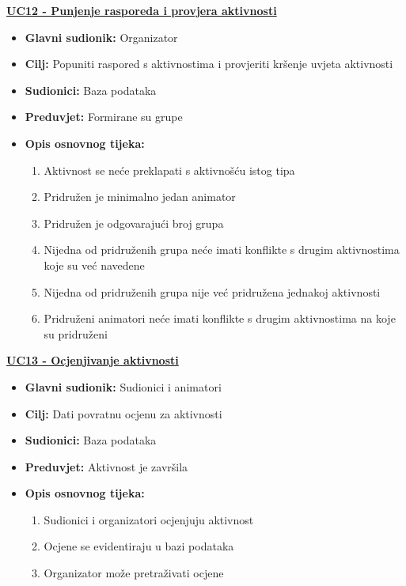 \noindent \underline{\textbf{UC12 - Punjenje rasporeda i provjera aktivnosti}}
\begin{itemize}
	\item \textbf{Glavni sudionik:} Organizator
	\item \textbf{Cilj:} Popuniti raspored s aktivnostima i provjeriti kršenje uvjeta aktivnosti
	\item \textbf{Sudionici:} Baza podataka
	\item \textbf{Preduvjet:} Formirane su grupe
	\item \textbf{Opis osnovnog tijeka:} 
	\begin{enumerate}	
		\item Aktivnost se neće preklapati s aktivnošću istog tipa
		\item Pridružen je minimalno jedan animator
		\item Pridružen je odgovarajući broj grupa
		\item Nijedna od pridruženih grupa neće imati konflikte s drugim aktivnostima koje su već
		navedene
		\item  Nijedna od pridruženih grupa nije već pridružena jednakoj aktivnosti
		\item Pridruženi animatori neće imati konflikte s drugim aktivnostima na koje su pridruženi\\
	\end{enumerate}
	
\end{itemize}



\noindent \underline{\textbf{UC13 - Ocjenjivanje aktivnosti}}
\begin{itemize}
	\item \textbf{Glavni sudionik:} Sudionici i animatori
	\item \textbf{Cilj:} Dati povratnu ocjenu za aktivnosti
	\item \textbf{Sudionici:} Baza podataka
	\item \textbf{Preduvjet:} Aktivnost je završila
	\item \textbf{Opis osnovnog tijeka:} 
	\begin{enumerate}	
		\item Sudionici i organizatori ocjenjuju aktivnost
		\item Ocjene se evidentiraju u bazi podataka
		\item Organizator može pretraživati ocjene\\
	\end{enumerate}
\end{itemize}


